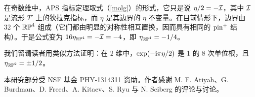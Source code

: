 在奇数维中，APS 指标定理取式（\ref{molg}）的形式，它只是说 $\eta/2=-{\mathcal I}$，其中 ${\mathcal I}$ 是流形 $T'$ 上的狄拉克指标，而 $\eta$ 是其边界的 $\eta$ 不变量。在目前情形下，边界由 32 个 ${\mathbb{RP}}^4$ 组成（它们都由明显的对称性相互置换，因而具有相同的 ${\mathrm{pin}}^+$ 结构）。于是公式变为 $16\eta_{{\mathbb{RP}}^4}=-{\mathcal I}=-4$，即 $\eta_{{\mathbb{RP}}^4}=-1/4$。

我们留请读者用类似方法证明：在 2 维中，$\exp(-{\mathrm i}\pi \eta/2)$ 是 1 的 8 次单位根，且 $\eta_{{\mathbb{RP}}^2}=\pm 1/2$。

本研究部分受 NSF 基金 PHY-1314311 资助。作者感谢 M. F. Atiyah、G. Burdman、D. Freed、A. Kitaev、S. Ryu 与 N. Seiberg 的评论与讨论。

